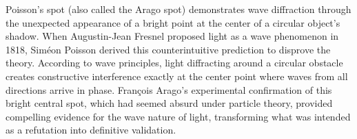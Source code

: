Poisson's spot (also called the Arago spot) demonstrates wave diffraction through the unexpected appearance of a bright point at the center of a circular object's shadow. When Augustin-Jean Fresnel proposed light as a wave phenomenon in 1818, Siméon Poisson derived this counterintuitive prediction to disprove the theory. According to wave principles, light diffracting around a circular obstacle creates constructive interference exactly at the center point where waves from all directions arrive in phase. François Arago's experimental confirmation of this bright central spot, which had seemed absurd under particle theory, provided compelling evidence for the wave nature of light, transforming what was intended as a refutation into definitive validation.

